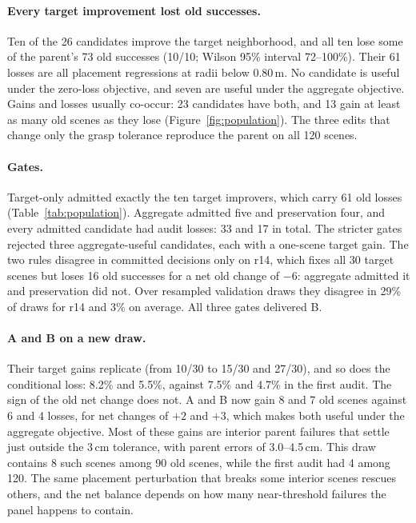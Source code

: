 \documentclass[letterpaper]{article} %
\begin{document}


\paragraph{Every target improvement lost old successes.} Ten of the 26 candidates improve the target neighborhood, and all ten lose some of the parent's 73 old successes (10/10; Wilson 95\% interval 72--100\%). Their 61 losses are all placement regressions at radii below 0.80\,m. No candidate is useful under the zero-loss objective, and seven are useful under the aggregate objective. Gains and losses usually co-occur: 23 candidates have both, and 13 gain at least as many old scenes as they lose (Figure~\ref{fig:population}). The three edits that change only the grasp tolerance reproduce the parent on all 120 scenes.

\paragraph{Gates.} Target-only admitted exactly the ten target improvers, which carry 61 old losses (Table~\ref{tab:population}). Aggregate admitted five and preservation four, and every admitted candidate had audit losses: 33 and 17 in total. The stricter gates rejected three aggregate-useful candidates, each with a one-scene target gain. The two rules disagree in committed decisions only on r14, which fixes all 30 target scenes but loses 16 old successes for a net old change of $-6$: aggregate admitted it and preservation did not. Over resampled validation draws they disagree in 29\% of draws for r14 and 3\% on average. All three gates delivered B.

\paragraph{A and B on a new draw.} Their target gains replicate (from 10/30 to 15/30 and 27/30), and so does the conditional loss: 8.2\% and 5.5\%, against 7.5\% and 4.7\% in the first audit. The sign of the old net change does not. A and B now gain 8 and 7 old scenes against 6 and 4 losses, for net changes of $+2$ and $+3$, which makes both useful under the aggregate objective. Most of these gains are interior parent failures that settle just outside the 3\,cm tolerance, with parent errors of 3.0--4.5\,cm. This draw contains 8 such scenes among 90 old scenes, while the first audit had 4 among 120. The same placement perturbation that breaks some interior scenes rescues others, and the net balance depends on how many near-threshold failures the panel happens to contain.
\end{document}
